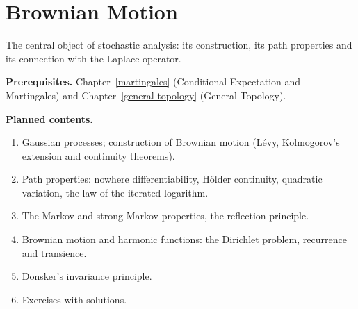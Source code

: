 \chapter{Brownian Motion}\label{brownian-motion}

The central object of stochastic analysis: its construction, its path properties and its connection
with the Laplace operator.

\noindent\textbf{Prerequisites.} Chapter~\ref{martingales} (Conditional Expectation and Martingales) and Chapter~\ref{general-topology} (General Topology).

\noindent\textbf{Planned contents.}
\begin{enumerate}
\item Gaussian processes; construction of Brownian motion (L\'evy, Kolmogorov's extension and continuity theorems).
\item Path properties: nowhere differentiability, H\"older continuity, quadratic variation, the law of the iterated logarithm.
\item The Markov and strong Markov properties, the reflection principle.
\item Brownian motion and harmonic functions: the Dirichlet problem, recurrence and transience.
\item Donsker's invariance principle.
\item Exercises with solutions.
\end{enumerate}
